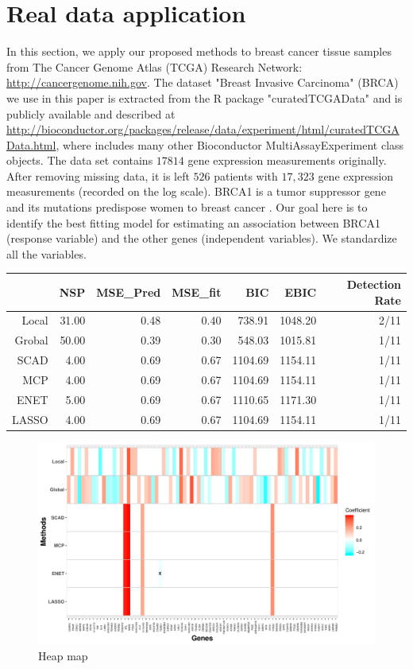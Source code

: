 \documentclass[12pt]{article}
\begin{document}
\section{Real data application}
 In this section, we apply our proposed methods to breast cancer tissue samples from The Cancer Genome Atlas (TCGA) Research Network: \url{http://cancergenome.nih.gov}. The dataset "Breast Invasive Carcinoma" (BRCA) we use in this paper is extracted from the R package "curatedTCGAData" and is publicly available and described at \url{http://bioconductor.org/packages/release/data/experiment/html/curatedTCGAData.html}, where includes many other Bioconductor MultiAssayExperiment class objects. The data set contains $17814$ gene expression measurements originally. After removing missing data, it is left $526$ patients with $17,323$ gene expression measurements (recorded on the log scale).  BRCA1 is a tumor suppressor gene and its mutations predispose women to breast cancer \citep{findlay2018accurate}. Our goal here is to identify the best fitting model for estimating an association between BRCA1 (response variable) and the other genes (independent variables). We standardize all the variables. 

\begin{table}[ht]
\centering
\begin{tabular}{rrrrrrr}
  \hline
 & NSP & MSE\_Pred & MSE\_fit & BIC & EBIC & Detection Rate\\ 
  \hline
  Local & 31.00 & 0.48 & 0.40 & 738.91 & 1048.20 & 2/11\\ 
  Grobal & 50.00 & 0.39 & 0.30 & 548.03 & 1015.81 & 1/11\\ 
  SCAD & 4.00 & 0.69 & 0.67 & 1104.69 & 1154.11 & 1/11\\ 
  MCP & 4.00 & 0.69 & 0.67 & 1104.69 & 1154.11 & 1/11\\ 
  ENET & 5.00 & 0.69 & 0.67 & 1110.65 & 1171.30 & 1/11\\ 
  LASSO & 4.00 & 0.69 & 0.67 & 1104.69 & 1154.11 & 1/11\\ 
   \hline
\end{tabular}
\end{table}

\begin{figure}
  \includegraphics[width=\linewidth]{Heatmap.pdf}
  \caption{Heap map}
  \label{fig:heatmap}
\end{figure}
\end{document}
